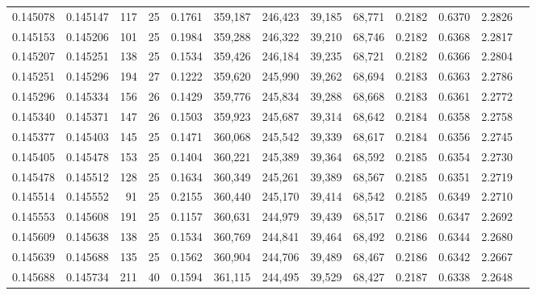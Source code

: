 \begin{tabular}{rrrrrrrrrrrrr}
0.145078 & 0.145147 & 117 &  25 &                                     0.1761 & 359,187 & 246,423 &  39,185 &  68,771 & 0.2182 & 0.6370 & 2.2826 \\
0.145153 & 0.145206 & 101 &  25 &                                     0.1984 & 359,288 & 246,322 &  39,210 &  68,746 & 0.2182 & 0.6368 & 2.2817 \\
0.145207 & 0.145251 & 138 &  25 &                                     0.1534 & 359,426 & 246,184 &  39,235 &  68,721 & 0.2182 & 0.6366 & 2.2804 \\
0.145251 & 0.145296 & 194 &  27 &                                     0.1222 & 359,620 & 245,990 &  39,262 &  68,694 & 0.2183 & 0.6363 & 2.2786 \\
0.145296 & 0.145334 & 156 &  26 &                                     0.1429 & 359,776 & 245,834 &  39,288 &  68,668 & 0.2183 & 0.6361 & 2.2772 \\
0.145340 & 0.145371 & 147 &  26 &                                     0.1503 & 359,923 & 245,687 &  39,314 &  68,642 & 0.2184 & 0.6358 & 2.2758 \\
0.145377 & 0.145403 & 145 &  25 &                                     0.1471 & 360,068 & 245,542 &  39,339 &  68,617 & 0.2184 & 0.6356 & 2.2745 \\
0.145405 & 0.145478 & 153 &  25 &                                     0.1404 & 360,221 & 245,389 &  39,364 &  68,592 & 0.2185 & 0.6354 & 2.2730 \\
0.145478 & 0.145512 & 128 &  25 &                                     0.1634 & 360,349 & 245,261 &  39,389 &  68,567 & 0.2185 & 0.6351 & 2.2719 \\
0.145514 & 0.145552 &  91 &  25 &                                     0.2155 & 360,440 & 245,170 &  39,414 &  68,542 & 0.2185 & 0.6349 & 2.2710 \\
0.145553 & 0.145608 & 191 &  25 &                                     0.1157 & 360,631 & 244,979 &  39,439 &  68,517 & 0.2186 & 0.6347 & 2.2692 \\
0.145609 & 0.145638 & 138 &  25 &                                     0.1534 & 360,769 & 244,841 &  39,464 &  68,492 & 0.2186 & 0.6344 & 2.2680 \\
0.145639 & 0.145688 & 135 &  25 &                                     0.1562 & 360,904 & 244,706 &  39,489 &  68,467 & 0.2186 & 0.6342 & 2.2667 \\
0.145688 & 0.145734 & 211 &  40 &                                     0.1594 & 361,115 & 244,495 &  39,529 &  68,427 & 0.2187 & 0.6338 & 2.2648 \\

\end{tabular}
